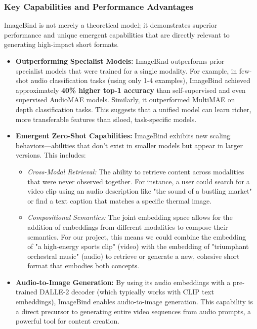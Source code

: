 \documentclass[12pt,a4paper,oneside,english]{book}
\begin{document}
\subsubsection{Key Capabilities and Performance Advantages}

ImageBind is not merely a theoretical model; it demonstrates superior performance and unique emergent capabilities that are directly relevant to generating high-impact short formats.

\begin{itemize}
    \item \textbf{Outperforming Specialist Models:} ImageBind outperforms prior specialist models that were trained for a single modality. For example, in few-shot audio classification tasks (using only 1-4 examples), ImageBind achieved approximately \textbf{40\% higher top-1 accuracy} than self-supervised and even supervised AudioMAE models. Similarly, it outperformed MultiMAE on depth classification tasks. This suggests that a unified model can learn richer, more transferable features than siloed, task-specific models.
    
    \item \textbf{Emergent Zero-Shot Capabilities:} ImageBind exhibits new scaling behaviors—abilities that don't exist in smaller models but appear in larger versions. This includes:
    \begin{itemize}
        \item \textit{Cross-Modal Retrieval:} The ability to retrieve content across modalities that were never observed together. For instance, a user could search for a video clip using an audio description like "the sound of a bustling market" or find a text caption that matches a specific thermal image.
        \item \textit{Compositional Semantics:} The joint embedding space allows for the addition of embeddings from different modalities to compose their semantics. For our project, this means we could combine the embedding of "a high-energy sports clip" (video) with the embedding of "triumphant orchestral music" (audio) to retrieve or generate a new, cohesive short format that embodies both concepts.
    \end{itemize}
    
    \item \textbf{Audio-to-Image Generation:} By using its audio embeddings with a pre-trained DALLE-2 decoder (which typically works with CLIP text embeddings), ImageBind enables audio-to-image generation. This capability is a direct precursor to generating entire video sequences from audio prompts, a powerful tool for content creation.
\end{itemize}
\end{document}
